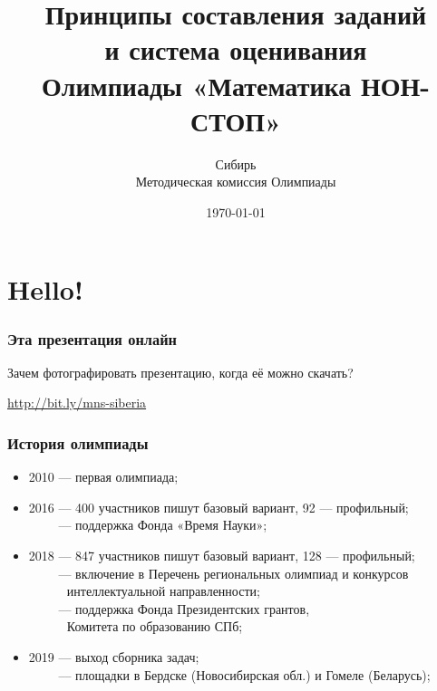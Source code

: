 \documentclass[aspectratio=1610,12pt]{beamer}
\title[Математика НОН-СТОП $\mid$ Семинар]
	{\bfseries Принципы составления заданий \\
		и система оценивания \\
		Олимпиады «Математика НОН-СТОП»}
\author[Б.~А.~Золотов, Е.~И.~Тодоров]
	{Сибирь \\ \vspace{0.3cm} Методическая комиссия Олимпиады}
\institute[\textcolor{white}{«Время науки», ЛНМО, ФПГ}]{}
\date{\today}
\begin{document}
\section[Приветствие]{Hello!}
\begin{frame}\titlepage\end{frame}

\begin{frame} \frametitle{Эта презентация онлайн}
\begin{center}
\vspace{-10mm}
Зачем фотографировать презентацию, когда её можно скачать?\vspace{4mm}

		\vspace{4mm}
		
		\url{http://bit.ly/mns-siberia}
\end{center}
\end{frame}



\begin{frame}\frametitle{История олимпиады}
\begin{itemize}
	\item 2010 — первая олимпиада;
	\item 2016 — 400 участников пишут базовый вариант, 92 --- профильный;\\
        $\phantom{2016}$ — поддержка Фонда «Время Науки»;
	\item 2018 — 847 участников пишут базовый вариант, 128 --- профильный;\\
        $\phantom{2018}$ — включение в Перечень региональных олимпиад и конкурсов\\
	$\phantom{2018 — }$\quad интеллектуальной направленности;\\
	$\phantom{2018}$ — поддержка Фонда Президентских грантов,\\
	$\phantom{2018 — }$\quad Комитета по образованию СПб;\\
	\item 2019 — выход сборника задач;\\
        $\phantom{2019}$ — площадки в Бердске (Новосибирская обл.) и Гомеле (Беларусь);\\
\end{itemize}\end{frame}
\end{document}
